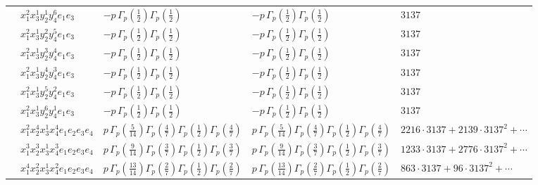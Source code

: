 \documentclass[11pt]{article}
\begin{document}
\begin{table}[ht]
{\begin{tabular}{@{}lllll@{}}
 & $x_{1}^{2} x_{3}^{1} y_{2}^{1} y_{4}^{6} e_{1} e_{3}$ & $- p \, \Gamma_p \left( \frac{1}{2} \right) \Gamma_p \left( \frac{1}{2} \right)$ & $- p \, \Gamma_p \left( \frac{1}{2} \right) \Gamma_p \left( \frac{1}{2} \right)$ & $3137$ \\
 & $x_{1}^{2} x_{3}^{1} y_{2}^{2} y_{4}^{5} e_{1} e_{3}$ & $- p \, \Gamma_p \left( \frac{1}{2} \right) \Gamma_p \left( \frac{1}{2} \right)$ & $- p \, \Gamma_p \left( \frac{1}{2} \right) \Gamma_p \left( \frac{1}{2} \right)$ & $3137$ \\
 & $x_{1}^{2} x_{3}^{1} y_{2}^{3} y_{4}^{4} e_{1} e_{3}$ & $- p \, \Gamma_p \left( \frac{1}{2} \right) \Gamma_p \left( \frac{1}{2} \right)$ & $- p \, \Gamma_p \left( \frac{1}{2} \right) \Gamma_p \left( \frac{1}{2} \right)$ & $3137$ \\
 & $x_{1}^{2} x_{3}^{1} y_{2}^{4} y_{4}^{3} e_{1} e_{3}$ & $- p \, \Gamma_p \left( \frac{1}{2} \right) \Gamma_p \left( \frac{1}{2} \right)$ & $- p \, \Gamma_p \left( \frac{1}{2} \right) \Gamma_p \left( \frac{1}{2} \right)$ & $3137$ \\
 & $x_{1}^{2} x_{3}^{1} y_{2}^{5} y_{4}^{2} e_{1} e_{3}$ & $- p \, \Gamma_p \left( \frac{1}{2} \right) \Gamma_p \left( \frac{1}{2} \right)$ & $- p \, \Gamma_p \left( \frac{1}{2} \right) \Gamma_p \left( \frac{1}{2} \right)$ & $3137$ \\
 & $x_{1}^{2} x_{3}^{1} y_{2}^{6} y_{4}^{1} e_{1} e_{3}$ & $- p \, \Gamma_p \left( \frac{1}{2} \right) \Gamma_p \left( \frac{1}{2} \right)$ & $- p \, \Gamma_p \left( \frac{1}{2} \right) \Gamma_p \left( \frac{1}{2} \right)$ & $3137$ \\
 & $x_{1}^{2} x_{2}^{4} x_{3}^{1} x_{4}^{4}  e_{1} e_{2} e_{3} e_{4}$ & $p \, \Gamma_p \left( \frac{5}{14} \right) \Gamma_p \left( \frac{4}{7} \right) \Gamma_p \left( \frac{1}{2} \right) \Gamma_p \left( \frac{4}{7} \right)$ & $p \, \Gamma_p \left( \frac{5}{14} \right) \Gamma_p \left( \frac{4}{7} \right) \Gamma_p \left( \frac{1}{2} \right) \Gamma_p \left( \frac{4}{7} \right)$ & $2216{\cdot}3137{+}2139{\cdot}3137^{2}{+}\cdots$ \\
 & $x_{1}^{3} x_{2}^{3} x_{3}^{1} x_{4}^{3}  e_{1} e_{2} e_{3} e_{4}$ & $p \, \Gamma_p \left( \frac{9}{14} \right) \Gamma_p \left( \frac{3}{7} \right) \Gamma_p \left( \frac{1}{2} \right) \Gamma_p \left( \frac{3}{7} \right)$ & $p \, \Gamma_p \left( \frac{9}{14} \right) \Gamma_p \left( \frac{3}{7} \right) \Gamma_p \left( \frac{1}{2} \right) \Gamma_p \left( \frac{3}{7} \right)$ & $1233{\cdot}3137{+}2776{\cdot}3137^{2}{+}\cdots$ \\
 & $x_{1}^{4} x_{2}^{2} x_{3}^{1} x_{4}^{2}  e_{1} e_{2} e_{3} e_{4}$ & $p \, \Gamma_p \left( \frac{13}{14} \right) \Gamma_p \left( \frac{2}{7} \right) \Gamma_p \left( \frac{1}{2} \right) \Gamma_p \left( \frac{2}{7} \right)$ & $p \, \Gamma_p \left( \frac{13}{14} \right) \Gamma_p \left( \frac{2}{7} \right) \Gamma_p \left( \frac{1}{2} \right) \Gamma_p \left( \frac{2}{7} \right)$ & $863{\cdot}3137{+}96{\cdot}3137^{2}{+}\cdots$ \\

\end{tabular}}
\end{table}
\end{document}
